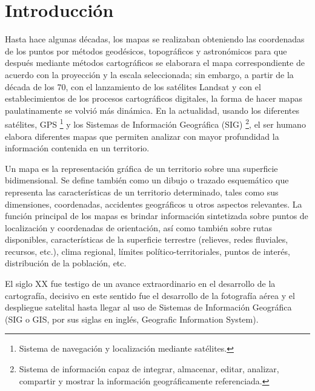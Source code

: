 
\chapter{Introducci\'on}

Hasta hace algunas d\'ecadas, los mapas se realizaban obteniendo las coordenadas de los puntos por m\'etodos geod\'esicos, topogr\'aficos y astron\'omicos para que despu\'es mediante m\'etodos cartogr\'aficos se elaborara el mapa correspondiente de acuerdo con la proyecci\'on y la escala seleccionada; sin embargo, a partir de la d\'ecada de los 70, con el lanzamiento de los sat\'elites Landsat y con el establecimientos de los procesos cartogr\'aficos digitales, la forma de hacer mapas paulatinamente se volvi\'o m\'as din\'amica. En la actualidad, usando los diferentes sat\'elites, GPS \footnote{Sistema de navegaci\'on y localizaci\'on mediante sat\'elites.} y los Sistemas de Informaci\'on Geogr\'afica (SIG) \footnote{Sistema de informaci\'on capaz de integrar, almacenar, editar, analizar, compartir y mostrar la informaci\'on geogr\'aficamente referenciada.}, el ser humano elabora diferentes mapas que permiten analizar con mayor profundidad la informaci\'on contenida en un territorio.

Un mapa es la representaci\'on gr\'afica de un territorio sobre una superficie bidimensional. Se define tambi\'en como un dibujo o trazado esquem\'atico que representa las caracter\'isticas de un territorio determinado, tales como sus dimensiones, coordenadas, accidentes geogr\'aficos u otros aspectos relevantes. La funci\'on principal de los mapas es brindar
informaci\'on sintetizada sobre puntos de localizaci\'on y coordenadas de orientaci\'on, as\'i como tambi\'en sobre rutas disponibles, caracter\'isticas de la superficie terrestre (relieves, redes fluviales, recursos, etc.), clima regional, l\'imites pol\'itico-territoriales, puntos de inter\'es, distribuci\'on de la poblaci\'on, etc.\cite{mapa}

El siglo XX fue testigo de un avance extraordinario en el desarrollo de la cartograf\'ia, decisivo en este sentido fue el desarrollo de la fotograf\'ia a\'erea y el despliegue satelital hasta llegar al uso de Sistemas de Informaci\'on Geogr\'afica \cite{SIG} (SIG o GIS, por sus siglas en ingl\'es, Geografic Information System).

